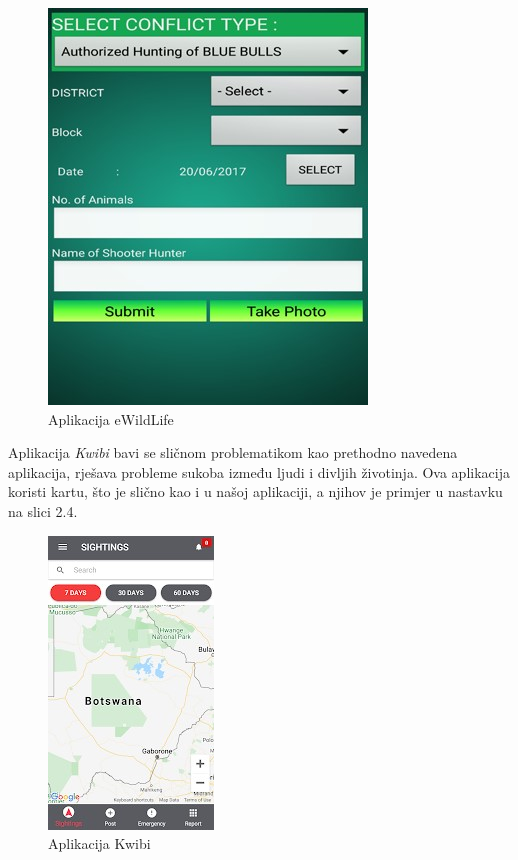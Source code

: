 		\begin{figure}[H]
			\includegraphics[scale=0.75]{slike/primjera1.JPG} %
			\centering
			\caption{Aplikacija eWildLife}
			\label{fig:ewildlife} %
		\end{figure}
		
		Aplikacija \textit{Kwibi} bavi se sličnom problematikom kao prethodno navedena aplikacija, rješava probleme sukoba između ljudi i divljih životinja. Ova aplikacija koristi kartu, što je slično kao i u našoj aplikaciji, a njihov je primjer u nastavku na slici 2.4.
		
		\begin{figure}[H]
			\includegraphics[scale=0.75]{slike/primjera2.JPG} %
			\centering
			\caption{Aplikacija Kwibi}
			\label{fig:kwibi} %
		\end{figure}
		

